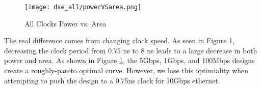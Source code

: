 \begin{figure}
    \begin{center}
        \texttt{[image: dse\_all/powerVSarea.png]}
        \caption{All Clocks Power vs. Area}
        \label{fig:all-pva}
    \end{center}
\end{figure}

The real difference comes from changing clock speed. As seen in Figure
\ref{fig:all-pva}, decreasing the clock period from 0.75 ns to 8 ns leads to
a large decrease in both power and area. As shown in Figure 
\ref{fig:all-pva}, the 5Gbps, 1Gbps, and 100Mbps designs create a roughly-pareto
optimal curve. However, we lose this optimiality when attempting to push the
design to a 0.75ns clock for 10Gbps ethernet. 


